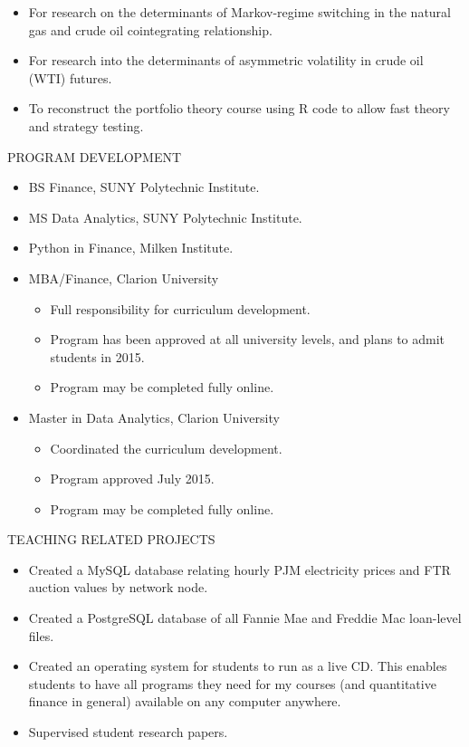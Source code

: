 \documentclass[9pt]{article}
\begin{document}
\begin{itemize}[noitemsep, nolistsep]
\item For research on the determinants of Markov-regime switching in the natural gas and crude oil cointegrating relationship. 
\item For research into the determinants of asymmetric volatility in crude oil (WTI) futures. 
\item To reconstruct the portfolio theory course using R code to allow fast theory and strategy testing.
\end{itemize}
\vspace{10pt}
PROGRAM DEVELOPMENT
\begin{itemize}[noitemsep, nolistsep]
\item BS Finance, SUNY Polytechnic Institute.
\item MS Data Analytics, SUNY Polytechnic Institute.
\item Python in Finance, Milken Institute.
\item MBA/Finance, Clarion University
  \begin{itemize}[noitemsep, nolistsep]
    \item Full responsibility for curriculum development.
    \item Program has been approved at all university levels, and plans to admit students in 2015.
    \item Program may be completed fully online.
  \end{itemize}
\item Master in Data Analytics, Clarion University
  \begin{itemize}[noitemsep, nolistsep]
    \item Coordinated the curriculum development.
    \item Program approved July 2015.
    \item Program may be completed fully online.
  \end{itemize}
\end{itemize}
\vspace{10pt}
TEACHING RELATED PROJECTS
\begin{itemize}[noitemsep, nolistsep]
\item Created a MySQL database relating hourly PJM electricity prices and FTR auction values by network node.
\item Created a PostgreSQL database of all Fannie Mae and Freddie Mac loan-level files.
\item Created an operating system for students to run as a live CD. This enables students to have all programs they need for my courses (and quantitative finance in general) available on any computer anywhere.
\item Supervised student research papers.
\end{itemize}
\end{document}
